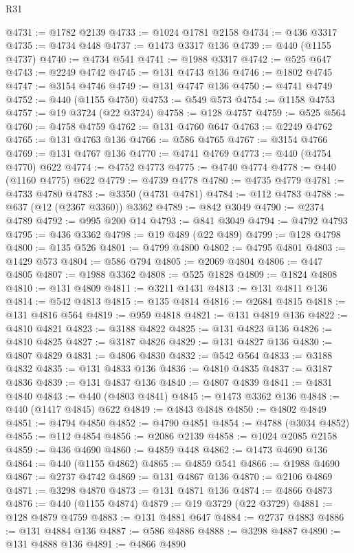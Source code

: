 \begin{lexlean}{R31}
\begin{coremodule}
@4731 := @1782 @2139
@4733 := @1024 @1781 @2158
@4734 := @436 @3317
@4735 := @4734 @448
@4737 := @1473 @3317 @136
@4739 := @440 (@1155 @4737)
@4740 := @4734 @541
@4741 := @1988 @3317
@4742 := @525 @647
@4743 := @2249 @4742
@4745 := @131 @4743 @136
@4746 := @1802 @4745
@4747 := @3154 @4746
@4749 := @131 @4747 @136
@4750 := @4741 @4749
@4752 := @440 (@1155 @4750)
@4753 := @549 @573
@4754 := @1158 @4753
@4757 := @19 @3724 (@22 @3724)
@4758 := @128 @4757
@4759 := @525 @564
@4760 := @4758 @4759
@4762 := @131 @4760 @647
@4763 := @2249 @4762
@4765 := @131 @4763 @136
@4766 := @586 @4765
@4767 := @3154 @4766
@4769 := @131 @4767 @136
@4770 := @4741 @4769
@4773 := @440 (@4754 @4770) @622
@4774 := @4752 @4773
@4775 := @4740 @4774
@4778 := @440 (@1160 @4775) @622
@4779 := @4739 @4778
@4780 := @4735 @4779
@4781 := @4733 @4780
@4783 := @3350 (@4731 @4781)
@4784 := @112 @4783
@4788 := @637 (@12 (@2367 @3360)) @3362
@4789 := @842 @3049
@4790 := @2374 @4789
@4792 := @995 @200 @14
@4793 := @841 @3049
@4794 := @4792 @4793
@4795 := @436 @3362
@4798 := @19 @489 (@22 @489)
@4799 := @128 @4798
@4800 := @135 @526
@4801 := @4799 @4800
@4802 := @4795 @4801
@4803 := @1429 @573
@4804 := @586 @794
@4805 := @2069 @4804
@4806 := @447 @4805
@4807 := @1988 @3362
@4808 := @525 @1828
@4809 := @1824 @4808
@4810 := @131 @4809
@4811 := @3211 @1431
@4813 := @131 @4811 @136
@4814 := @542 @4813
@4815 := @135 @4814
@4816 := @2684 @4815
@4818 := @131 @4816 @564
@4819 := @959 @4818
@4821 := @131 @4819 @136
@4822 := @4810 @4821
@4823 := @3188 @4822
@4825 := @131 @4823 @136
@4826 := @4810 @4825
@4827 := @3187 @4826
@4829 := @131 @4827 @136
@4830 := @4807 @4829
@4831 := @4806 @4830
@4832 := @542 @564
@4833 := @3188 @4832
@4835 := @131 @4833 @136
@4836 := @4810 @4835
@4837 := @3187 @4836
@4839 := @131 @4837 @136
@4840 := @4807 @4839
@4841 := @4831 @4840
@4843 := @440 (@4803 @4841)
@4845 := @1473 @3362 @136
@4848 := @440 (@1417 @4845) @622
@4849 := @4843 @4848
@4850 := @4802 @4849
@4851 := @4794 @4850
@4852 := @4790 @4851
@4854 := @4788 (@3034 @4852)
@4855 := @112 @4854
@4856 := @2086 @2139
@4858 := @1024 @2085 @2158
@4859 := @436 @4690
@4860 := @4859 @448
@4862 := @1473 @4690 @136
@4864 := @440 (@1155 @4862)
@4865 := @4859 @541
@4866 := @1988 @4690
@4867 := @2737 @4742
@4869 := @131 @4867 @136
@4870 := @2106 @4869
@4871 := @3298 @4870
@4873 := @131 @4871 @136
@4874 := @4866 @4873
@4876 := @440 (@1155 @4874)
@4879 := @19 @3729 (@22 @3729)
@4881 := @128 @4879 @4759
@4883 := @131 @4881 @647
@4884 := @2737 @4883
@4886 := @131 @4884 @136
@4887 := @586 @4886
@4888 := @3298 @4887
@4890 := @131 @4888 @136
@4891 := @4866 @4890

\end{coremodule}
\end{lexlean}

